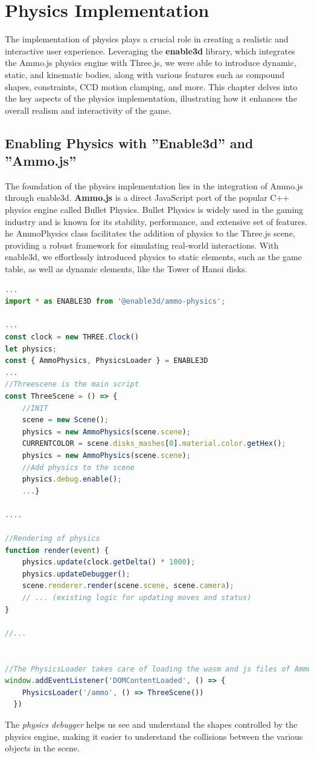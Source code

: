 \documentclass{article}
\begin{document}
\newpage

\section{Physics Implementation}
The implementation of physics plays a crucial role in creating a realistic and interactive user experience. Leveraging the \textbf{enable3d} library, which integrates the Ammo.js physics engine with Three.js, we were able to introduce dynamic, static, and kinematic bodies, along with various features such as compound shapes, constraints, CCD motion clamping, and more. This chapter delves into the key aspects of the physics implementation, illustrating how it enhances the overall realism and interactivity of the game.
\subsection{Enabling Physics with ''Enable3d'' and ''Ammo.js''}
The foundation of the physics implementation lies in the integration of Ammo.js through enable3d. \textbf{Ammo.js} is a direct JavaScript port of the popular C++ physics engine called Bullet Physics. Bullet Physics is widely used in the gaming industry and is known for its stability, performance, and extensive set of features. he AmmoPhysics class facilitates the addition of physics to the Three.js scene, providing a robust framework for simulating real-world interactions. With enable3d, we effortlessly introduced physics to static elements, such as the game table, as well as dynamic elements, like the Tower of Hanoi disks.
\begin{lstlisting}[language=JavaScript, caption={Ammophyiscs and PhyisicsLoader}]
...
import * as ENABLE3D from '@enable3d/ammo-physics';

...
const clock = new THREE.Clock()
let physics;
const { AmmoPhysics, PhysicsLoader } = ENABLE3D
...
//Threescene is the main script
const ThreeScene = () => {
    //INIT
    scene = new Scene();
    physics = new AmmoPhysics(scene.scene);
    CURRENTCOLOR = scene.disks_mashes[0].material.color.getHex();
    physics = new AmmoPhysics(scene.scene);
    //Add physics to the scene
    physics.debug.enable();
    ...}
    
....

//Rendering of physics
function render(event) {
    physics.update(clock.getDelta() * 1000);
    physics.updateDebugger();
    scene.renderer.render(scene.scene, scene.camera);
    // ... (existing logic for updating moves and status)
}

//...


//The PhysicsLoader takes care of loading the wasm and js files of Ammo.js before starting the script.
window.addEventListener('DOMContentLoaded', () => {
    PhysicsLoader('/ammo', () => ThreeScene())
  })
\end{lstlisting}
The \textit{physics debugger} helps us see and understand the shapes controlled by the physics engine, making it easier to understand the collisions between the various objects in the scene.
\newpage 
\end{document}
